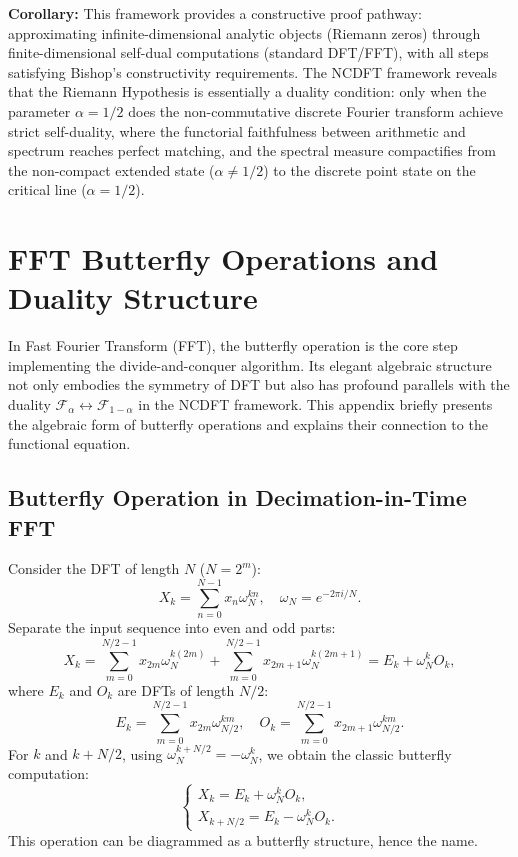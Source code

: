 \documentclass[12pt,a4paper]{amsart}
\theoremstyle{plain}
\theoremstyle{definition}
\theoremstyle{remark}
\begin{document}
\textbf{Corollary:} This framework provides a constructive proof pathway: approximating infinite-dimensional analytic objects (Riemann zeros) through finite-dimensional self-dual computations (standard DFT/FFT), with all steps satisfying Bishop's constructivity requirements. The NCDFT framework reveals that the Riemann Hypothesis is essentially a duality condition: only when the parameter $\alpha=1/2$ does the non-commutative discrete Fourier transform achieve strict self-duality, where the functorial faithfulness between arithmetic and spectrum reaches perfect matching, and the spectral measure compactifies from the non-compact extended state ($\alpha \neq 1/2$) to the discrete point state on the critical line ($\alpha = 1/2$).

\appendix

\section{FFT Butterfly Operations and Duality Structure}\label{app:butterfly}

In Fast Fourier Transform (FFT), the butterfly operation is the core step implementing the divide-and-conquer algorithm. Its elegant algebraic structure not only embodies the symmetry of DFT but also has profound parallels with the duality $\mathcal{F}_\alpha \leftrightarrow \mathcal{F}_{1-\alpha}$ in the NCDFT framework. This appendix briefly presents the algebraic form of butterfly operations and explains their connection to the functional equation.

\subsection{Butterfly Operation in Decimation-in-Time FFT}

Consider the DFT of length $N$ ($N=2^m$):
\begin{equation}
X_k = \sum_{n=0}^{N-1} x_n \omega_N^{kn}, \quad \omega_N = e^{-2\pi i/N}.
\end{equation}
Separate the input sequence into even and odd parts:
\begin{equation}
X_k = \sum_{m=0}^{N/2-1} x_{2m} \omega_N^{k(2m)} + \sum_{m=0}^{N/2-1} x_{2m+1} \omega_N^{k(2m+1)} = E_k + \omega_N^k O_k,
\end{equation}
where $E_k$ and $O_k$ are DFTs of length $N/2$:
\begin{equation}
E_k = \sum_{m=0}^{N/2-1} x_{2m} \omega_{N/2}^{km}, \quad O_k = \sum_{m=0}^{N/2-1} x_{2m+1} \omega_{N/2}^{km}.
\end{equation}
For $k$ and $k+N/2$, using $\omega_N^{k+N/2} = -\omega_N^k$, we obtain the classic butterfly computation:
\begin{equation}
\begin{cases}
X_k = E_k + \omega_N^k O_k, \\
X_{k+N/2} = E_k - \omega_N^k O_k.
\end{cases}
\end{equation}
This operation can be diagrammed as a butterfly structure, hence the name.
\end{document}
